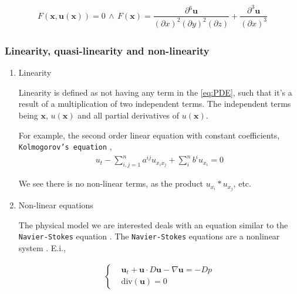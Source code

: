\documentclass[12pt]{article}
\begin{document}
\begin{equation}
\label{eq:sixth-order}
\begin{aligned}
F(\mathbf{x},\mathbf{u(x)}) = 0 \, \land \,
F(\mathbf{x}) = \dfrac{\partial{}^6 \mathbf{u}}{(\partial{x})^2(\partial{y})^2(\partial{z})} + \dfrac{\partial^3{} \mathbf{u}}{(\partial{x})^3}
\end{aligned}
\end{equation}

\subsubsection{Linearity, quasi-linearity and non-linearity}
\label{sec:org78c774f}
\begin{enumerate}
\item Linearity
\label{sec:orge8c4e5f}

Linearity is defined as not having any term in the \eqref{eq:PDE}, such that it's
a result of a multiplication of two independent terms. The independent terms
being \(\mathbf{x}\), \(u(\mathbf{x})\) and all partial derivatives of
\(u(\mathbf{x})\).

For example, the second order linear equation with constant
coefficients, \texttt{Kolmogorov's equation} \cite{evans1998partial},
\begin{equation}
\begin{aligned}
u_{t} - \sum_{i,j=1}^{n}{a^{ij}u_{x_{i}x_{j}}} + \sum_{i}^{n}{b^{i}u_{x_{i}}} = 0
\end{aligned}
\end{equation}

We see there is no non-linear terms, as the product \(u_{x_{i}}*u_{x_{j}}\), etc.

\item Non-linear equations
\label{sec:org5fe54f7}
\label{sec:non-linear}

The physical model we are interested deals with an equation similar to the
\texttt{Navier-Stokes} equation \cite{kerner1993}. The \texttt{Navier-Stokes} equations are a
nonlinear system \cite{john1978partial} \cite{kerner1993}.
E.i.,

\begin{equation}
\label{eq:NavEstEQ}
\begin{aligned}
\begin{cases}
&\mathbf{u}_t + \mathbf{u} \cdot{} D\mathbf{u} - \nabla \mathbf{u} = - Dp \\
&\text{div}(\mathbf{u}) = 0
\end{cases}
\end{aligned}
\end{equation}


\end{enumerate}
\end{document}
